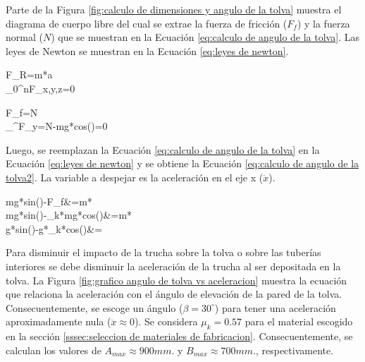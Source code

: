 Parte de la Figura \ref{fig:calculo de dimensiones y angulo de la tolva} muestra el diagrama de cuerpo libre del cual se extrae la fuerza de fricción ($F_{f}$) y la fuerza normal ($N$) que se muestran en la Ecuación \ref{eq:calculo de angulo de la tolva}. Las leyes de Newton se muestran en la Ecuación \ref{eq:leyes de newton}. 

\begin{myequation}\label{eq:leyes de newton}
	\begin{split}
		F_{R}=m*a \\
		\sum_{0}^{n}F_{x,y,z}=0
	\end{split}
\end{myequation}

\begin{myequation}\label{eq:calculo de angulo de la tolva}
	\begin{split}
		F_{f}=\mu*N  \\
		\sum_{}^{}F_{y}=N-mg*cos(\beta)=0
	\end{split}
\end{myequation}

Luego, se reemplazan la Ecuación \ref{eq:calculo de angulo de la tolva} en la Ecuación \ref{eq:leyes de newton} y se obtiene la Ecuación \ref{eq:calculo de angulo de la tolva2}. La variable a despejar es la aceleración en el eje x ($\ddot{x}$).

\begin{myequation}\label{eq:calculo de angulo de la tolva2}
	\begin{split}
		mg*sin(\beta)-F_{f}&=m*\ddot{x} \\
		mg*sin(\beta)-\mu_{k}*mg*cos(\beta)&=m*\ddot{x} \\
		g*sin(\beta)-g*\mu_{k}*cos(\beta)&=\ddot{x}
	\end{split}
\end{myequation}

Para disminuir el impacto de la trucha sobre la tolva o sobre las tuberías interiores se debe disminuir la aceleración de la trucha al ser depositada en la tolva. La Figura \ref{fig:grafico angulo de tolva vs aceleracion} muestra la ecuación que relaciona la aceleración con el ángulo de elevación de la pared de la tolva. Consecuentemente, se escoge un ángulo ($\beta=30^\circ$) para tener una aceleración aproximadamente nula ($\approx0$). Se considera $\mu_{k}=0.57$ para el material escogido en la sección \ref{sssec:seleccion de materiales de fabricacion}. Consecuentemente, se calculan los valores de $A_{max}\approx{900} mm.$ y $B_{max}\approx{700} mm.$, respectivamente.


